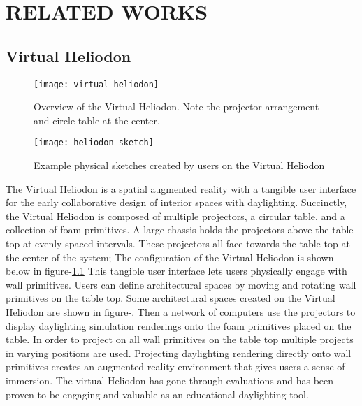 \chapter{RELATED WORKS} \label{sec:introduction}

\section{Virtual Heliodon}

	\begin{figure}[h]
	\centering
	\texttt{[image: virtual\_heliodon]}
	\label{fig:virtual_heliodon}
	\caption{Overview of the Virtual Heliodon. Note the projector arrangement and circle table at the center.}
	\end{figure}

	\begin{figure}[h]
	\centering
	\texttt{[image: heliodon\_sketch]}
	\label{fig:heliodon_sketch}
	\caption{Example physical sketches created by users on the Virtual Heliodon}
	\end{figure}

	The Virtual Heliodon is a spatial augmented reality with a tangible user interface for the early collaborative design of interior spaces with daylighting\cite{sheng2009virtual, cutler2009inferring,nasman2013physical,nasman2013evaluation,cutler2010interpreting}. 
	Succinctly, the Virtual Heliodon is composed of multiple projectors, a circular table, and a collection of foam primitives.  
	A large chassis holds the projectors above the table top at evenly spaced intervals. 
	These projectors all face towards the table top at the center of the system;
	The configuration of the Virtual Heliodon is shown below in figure-\ref{fig:virtual_heliodon}
	This tangible user interface lets users physically engage with wall primitives. 
	Users can define architectural spaces by moving and rotating wall primitives on the table top.
	Some architectural spaces created on the Virtual Heliodon are shown in figure-\cite{fig:heliodon_sketch}.
	Then a network of computers use the projectors to display daylighting simulation renderings onto the foam primitives placed on the table.
	In order to project on all wall primitives on the table top multiple projects in varying positions are used.
	Projecting daylighting rendering directly onto wall primitives creates an augmented reality environment that gives users a sense of immersion\cite{nasman2013evaluation}.
	The virtual Heliodon has gone through evaluations and has been proven to be engaging and valuable as an educational daylighting tool\cite{nasman2013evaluation}.

